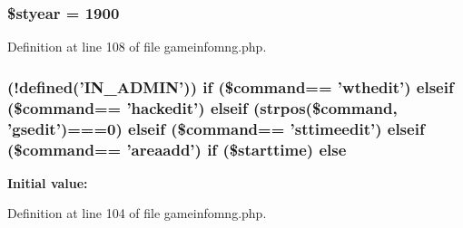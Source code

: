 \hypertarget{gameinfomng_8php_a9cfaedc526b9ac44dbc3a05ef88916ed}{
\subsubsection[{\$styear}]{\setlength{\rightskip}{0pt plus 5cm}\$styear = 1900}}\label{gameinfomng_8php_a9cfaedc526b9ac44dbc3a05ef88916ed}


Definition at line 108 of file gameinfomng.\+php.

\hypertarget{gameinfomng_8php_a9934db7a41333980f5074d52a5a87346}{
\subsubsection[{else}]{ (!defined('{\bf I\+N\+\_\+\+A\+D\+M\+I\+N}')) {\bf if} (\$command== 'wthedit') {\bf elseif} (\$command== 'hackedit') {\bf elseif} (strpos(\$command, 'gsedit')===0) {\bf elseif} (\$command== 'sttimeedit') {\bf elseif} (\$command== 'areaadd') {\bf if} (\$starttime) else}}\label{gameinfomng_8php_a9934db7a41333980f5074d52a5a87346}
{\bfseries Initial value\+:}


Definition at line 104 of file gameinfomng.\+php.

